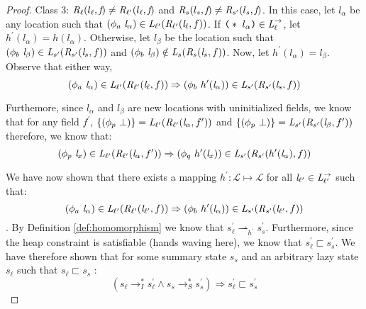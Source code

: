 \begin{proof}
Class 3: $\emph{R}_\ell ( l_\ell,  \emph{f}) \neq \emph{R}_{\ell^\prime} ( l_\ell,  \emph{f})$ and $\emph{R}_{s} ( l_s,  \emph{f}) \neq \emph{R}_{s^\prime} ( l_s,  \emph{f})$. In this case, let $l_\alpha$ be any location such that $(\phi_a\ \cfgnt{l}_\alpha) \in \cfgnt{L}_{\ell^\prime}(\cfgnt{R}_{\ell^\prime} (\cfgnt{l}_\ell,f )) $. If $\lp *\ l_\alpha \rp \in \cfgnt{L}_{\ell}^\rightarrow $, let $h^\prime(l_\alpha) = h(l_\alpha)$. Otherwise, let $l_\beta$ be the location such that $(\phi_b\ \cfgnt{l}_\beta) \in \cfgnt{L}_{s^\prime}(\cfgnt{R}_{s^\prime} (\cfgnt{l}_s,f )) $ and $(\phi_b\ \cfgnt{l}_\beta) \notin \cfgnt{L}_{s}(\cfgnt{R}_{s} (\cfgnt{l}_s,f )) $. Now, let $h^\prime(l_\alpha) = l_\beta$. Observe that either way,
$$(\phi_a\ \cfgnt{l}_\alpha) \in \cfgnt{L}_{\ell^\prime}(\cfgnt{R}_{\ell^\prime} (\cfgnt{l}_\ell,f )) \Rightarrow (\phi_b\ h^\prime (\cfgnt{l}_\alpha))\in \cfgnt{L}_{s^\prime}(\cfgnt{R}_{s^\prime} (\cfgnt{l}_s,f ))$$

Furthemore, since $l_\alpha$ and $l_\beta$ are new locations with uninitialized fields, we know that for any field $f^\prime$, $\{(\phi_p\ \bot)\} = \emph{L}_{\ell^\prime}(\emph{R}_{\ell^\prime} (\emph{l}_\alpha,f^\prime ))$ and $ \{(\phi_p\ \bot)\} = \emph{L}_{s^\prime}(\emph{R}_{s^\prime} (\emph{l}_\beta,f^\prime ))$ therefore, we know that:
$$(\phi_p\ \emph{l}_x) \in \emph{L}_{\ell^\prime}(\emph{R}_{\ell^\prime} (\emph{l}_\alpha,f^\prime )) \Rightarrow (\phi_q\ h^\prime (\emph{l}_x))\in \emph{L}_{s^\prime}(\emph{R}_{s^\prime} ( h^\prime(\emph{l}_\alpha),f ))$$

We have now shown that there exists a mapping $h^\prime: \mathcal{L} \mapsto \mathcal{L}$ for all $\emph{l}_{\ell^\prime} \in \emph{L}_{\ell^\prime}^\rightarrow$ such that:
$$ (\phi_a\ \emph{l}_\alpha) \in \emph{L}_{\ell^\prime}(\emph{R}_{\ell^\prime} (\emph{l}_{\ell^\prime},f )) \Rightarrow (\phi_b\ h^\prime (\emph{l}_\alpha))\in \emph{L}_{s^\prime}(\emph{R}_{s^\prime} (\emph{l}_{\ell^\prime},f )) $$. By Definition \ref{def:homomorphism} we know that $s_\ell^\prime \rightharpoonup_{h^\prime} s_s^\prime$. Furthermore, since the heap constraint is satisfiable (hands waving here), we know that $s_\ell^\prime \sqsubset s_s^\prime $. We have therefore shown that for some summary state $s_s$ and an arbitrary lazy state $s_\ell$ such that $s_\ell \sqsubset s_s$ :
\begin{equation} 
(s_\ell \rightarrow_I^* s_\ell^\prime \wedge s_s \rightarrow_S^* s_s^\prime) \Rightarrow s_\ell^\prime \sqsubset s_s^\prime 
\end{equation}


\end{proof}
